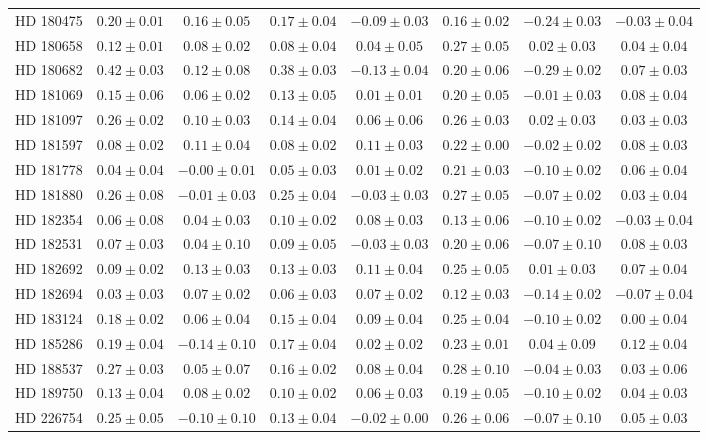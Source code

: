 \begin{table*}
\begin{tabular}{cccccccc}
HD 180475 & $0.20 \pm 0.01$ & $0.16 \pm 0.05$ & $0.17 \pm 0.04$ & $-0.09 \pm 0.03$ & $0.16 \pm 0.02$ & $-0.24 \pm 0.03$ & $-0.03 \pm 0.04$ \\
HD 180658 & $0.12 \pm 0.01$ & $0.08 \pm 0.02$ & $0.08 \pm 0.04$ & $0.04 \pm 0.05$ & $0.27 \pm 0.05$ & $0.02 \pm 0.03$ & $0.04 \pm 0.04$ \\
HD 180682 & $0.42 \pm 0.03$ & $0.12 \pm 0.08$ & $0.38 \pm 0.03$ & $-0.13 \pm 0.04$ & $0.20 \pm 0.06$ & $-0.29 \pm 0.02$ & $0.07 \pm 0.03$ \\
HD 181069 & $0.15 \pm 0.06$ & $0.06 \pm 0.02$ & $0.13 \pm 0.05$ & $0.01 \pm 0.01$ & $0.20 \pm 0.05$ & $-0.01 \pm 0.03$ & $0.08 \pm 0.04$ \\
HD 181097 & $0.26 \pm 0.02$ & $0.10 \pm 0.03$ & $0.14 \pm 0.04$ & $0.06 \pm 0.06$ & $0.26 \pm 0.03$ & $0.02 \pm 0.03$ & $0.03 \pm 0.03$ \\
HD 181597 & $0.08 \pm 0.02$ & $0.11 \pm 0.04$ & $0.08 \pm 0.02$ & $0.11 \pm 0.03$ & $0.22 \pm 0.00$ & $-0.02 \pm 0.02$ & $0.08 \pm 0.03$ \\
HD 181778 & $0.04 \pm 0.04$ & $-0.00 \pm 0.01$ & $0.05 \pm 0.03$ & $0.01 \pm 0.02$ & $0.21 \pm 0.03$ & $-0.10 \pm 0.02$ & $0.06 \pm 0.04$ \\
HD 181880 & $0.26 \pm 0.08$ & $-0.01 \pm 0.03$ & $0.25 \pm 0.04$ & $-0.03 \pm 0.03$ & $0.27 \pm 0.05$ & $-0.07 \pm 0.02$ & $0.03 \pm 0.04$ \\
HD 182354 & $0.06 \pm 0.08$ & $0.04 \pm 0.03$ & $0.10 \pm 0.02$ & $0.08 \pm 0.03$ & $0.13 \pm 0.06$ & $-0.10 \pm 0.02$ & $-0.03 \pm 0.04$ \\
HD 182531 & $0.07 \pm 0.03$ & $0.04 \pm 0.10$ & $0.09 \pm 0.05$ & $-0.03 \pm 0.03$ & $0.20 \pm 0.06$ & $-0.07 \pm 0.10$ & $0.08 \pm 0.03$ \\
HD 182692 & $0.09 \pm 0.02$ & $0.13 \pm 0.03$ & $0.13 \pm 0.03$ & $0.11 \pm 0.04$ & $0.25 \pm 0.05$ & $0.01 \pm 0.03$ & $0.07 \pm 0.04$ \\
HD 182694 & $0.03 \pm 0.03$ & $0.07 \pm 0.02$ & $0.06 \pm 0.03$ & $0.07 \pm 0.02$ & $0.12 \pm 0.03$ & $-0.14 \pm 0.02$ & $-0.07 \pm 0.04$ \\
HD 183124 & $0.18 \pm 0.02$ & $0.06 \pm 0.04$ & $0.15 \pm 0.04$ & $0.09 \pm 0.04$ & $0.25 \pm 0.04$ & $-0.10 \pm 0.02$ & $0.00 \pm 0.04$ \\
HD 185286 & $0.19 \pm 0.04$ & $-0.14 \pm 0.10$ & $0.17 \pm 0.04$ & $0.02 \pm 0.02$ & $0.23 \pm 0.01$ & $0.04 \pm 0.09$ & $0.12 \pm 0.04$ \\
HD 188537 & $0.27 \pm 0.03$ & $0.05 \pm 0.07$ & $0.16 \pm 0.02$ & $0.08 \pm 0.04$ & $0.28 \pm 0.10$ & $-0.04 \pm 0.03$ & $0.03 \pm 0.06$ \\
HD 189750 & $0.13 \pm 0.04$ & $0.08 \pm 0.02$ & $0.10 \pm 0.02$ & $0.06 \pm 0.03$ & $0.19 \pm 0.05$ & $-0.10 \pm 0.02$ & $0.04 \pm 0.03$ \\
HD 226754 & $0.25 \pm 0.05$ & $-0.10 \pm 0.10$ & $0.13 \pm 0.04$ & $-0.02 \pm 0.00$ & $0.26 \pm 0.06$ & $-0.07 \pm 0.10$ & $0.05 \pm 0.03$ \\
\hline
\end{tabular}
\end{table*}
